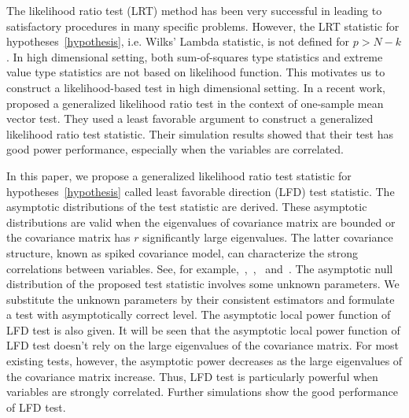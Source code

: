 \documentclass[12pt]{article} %
\newcommand{\bfsym}[1]{\ensuremath{\boldsymbol{#1}}}
\def\bSigma {\bfsym {\Sigma}}
\theoremstyle{definition}
\begin{document}
   The likelihood ratio test (LRT) method has been very successful in leading to satisfactory procedures in many specific problems.
    However, the LRT statistic for hypotheses~\eqref{hypothesis}, i.e. Wilks' Lambda statistic, is not defined for $p>N-k$.
   In high dimensional setting, both sum-of-squares type statistics and extreme value type statistics are not based on likelihood function.
    This motivates us to construct a likelihood-based test in high dimensional setting.
    In a recent work,~\cite{Zhao2016A} proposed a generalized likelihood ratio test in the context of one-sample mean vector test.
    They used a least favorable argument to construct a generalized likelihood ratio test statistic.
    Their simulation results showed that their test has good power performance, especially when the variables are correlated.


    In this paper, we propose a generalized likelihood ratio test statistic for hypotheses~\eqref{hypothesis} called least favorable direction (LFD) test statistic.
    The asymptotic distributions of the test statistic are derived.
    These asymptotic distributions are valid when the eigenvalues of covariance matrix are bounded or the covariance matrix has $r$ significantly large eigenvalues.
    The latter covariance structure, known as spiked covariance model, can characterize the strong correlations between variables. See, for example,~\citet{Fan2008High},~\citet{Cai2012Sparse},~\citet{Shen2013Consistency} and~\citet{Ma2015A}.
    The asymptotic null distribution of the proposed test statistic involves some unknown parameters.
    We substitute the unknown parameters by their consistent estimators and formulate a test with asymptotically correct level.
    The asymptotic local power function of LFD test is also given.
 It will be seen that the asymptotic local power function of LFD test doesn't rely on the large eigenvalues of the covariance matrix.
For most existing tests, however, the asymptotic power decreases as the large eigenvalues of the covariance matrix increase.
    Thus, LFD test is particularly powerful when variables are strongly correlated.
    Further simulations show the good performance of LFD test.
\end{document}
